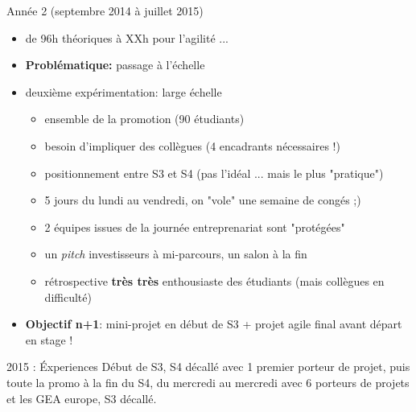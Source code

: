 \documentclass{beamer}
\begin{document}
\begin{frame}{Année 2 (septembre 2014 à juillet 2015)}
  \begin{itemize}
    \item de 96h théoriques à XXh pour l'agilité ...
    \item \textbf{Problématique:} passage à l'échelle
    \item deuxième expérimentation: large échelle
      \begin{itemize}
        \item ensemble de la promotion (90 étudiants)
        \item besoin d'impliquer des collègues (4 encadrants nécessaires !)
        \item positionnement entre S3 et S4 (pas l'idéal ... mais le plus "pratique")
        \item 5 jours du lundi au vendredi, on "vole" une semaine de congés ;)
        \item 2 équipes issues de la journée entreprenariat sont "protégées"
        \item un \emph{pitch} investisseurs à mi-parcours, un salon à la fin
        \item rétrospective \textbf{très très} enthousiaste des étudiants (mais collègues en difficulté)
      \end{itemize}
      \item \textbf{Objectif n+1}: mini-projet en début de S3 + projet agile final avant départ en stage !
  \end{itemize}
\end{frame}

\begin{frame}{2015 : Éxperiences}
  Début de S3, S4 décallé avec 1 premier porteur de projet, puis toute la promo à la fin du S4, du mercredi au mercredi avec 6 porteurs de projets et les GEA europe, S3 décallé.
\end{frame}
\end{document}
